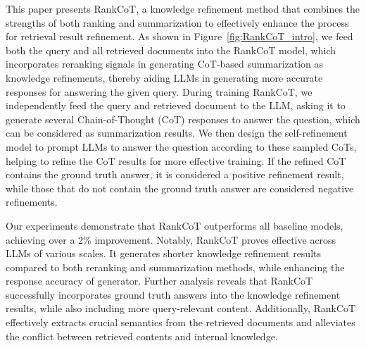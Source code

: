 




This paper presents RankCoT, a knowledge refinement method that combines the strengths of both ranking and summarization to effectively enhance the process for retrieval result refinement. As shown in Figure~\ref{fig:RankCoT_intro}, we feed both the query and all retrieved documents into the RankCoT model, which incorporates reranking signals in generating CoT-based summarization as knowledge refinements, thereby aiding LLMs in generating more accurate responses for answering the given query. During training RankCoT, we independently feed the query and retrieved document to the LLM, asking it to generate several Chain-of-Thought (CoT) responses to answer the question, which can be considered as summarization results. We then design the self-refinement model to prompt LLMs to answer the question according to these sampled CoTs, helping to refine the CoT results for more effective training. If the refined CoT contains the ground truth answer, it is considered a positive refinement result, while those that do not contain the ground truth answer are considered negative refinements. 



Our experiments demonstrate that RankCoT outperforms all baseline models, achieving over a 2\% improvement. Notably, RankCoT proves effective across LLMs of various scales. It generates shorter knowledge refinement results compared to both reranking and summarization methods, while enhancing the response accuracy of generator. Further analysis reveals that RankCoT successfully incorporates ground truth answers into the knowledge refinement results, while also including more query-relevant content. Additionally, RankCoT effectively extracts crucial semantics from the retrieved documents and alleviates the conflict between retrieved contents and internal knowledge.

